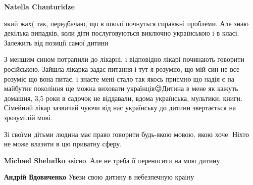 \begin{itemize}
\begin{itemize}
\textbf{Natella Chanturidze} 

який жах( так, передбачаю, що в школі почнуться справжні проблеми. Але знаю
декілька випадків, коли діти послуговуються виключно українською і в класі.
Залежить від позиції самої дитини


 

З меншим сином потрапили до лікарні, і відповідно лікарі починають говорити
російською. Зайшла лікарка задає питання і тут я розумію, що мій син не все
розуміє що вона питає, і знаєте мені стало так якось приємно що надія є на
майбутнє покоління ще можна виховати українців😉Дитина в мене як кажуть
домашня, 3,5 роки в садочок не віддавали, вдома українська, мультики, книги.
Сімейний лікар зазвичай чуючи від нас українську до дитини звертається на
зрозумілій мові.

\end{itemize}

 
Зі своїми дітьми людина має право говорити будь-якою мовою, якою хоче. Ніхто не
може влазити в цю приватну сферу.

\begin{itemize}
 
\textbf{Michael Sheludko} звісно. Але не треба її переносити на мою дитину

 
\textbf{Андрій Вдовиченко} Увези свою дитину в небезпечную краіну
\end{itemize}

\end{itemize}

